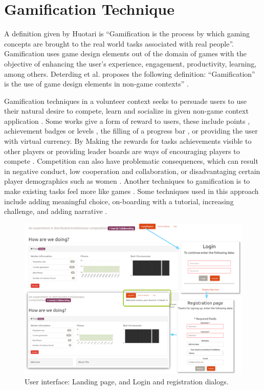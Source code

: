 \documentclass{llncs}
\begin{document}
\section{Gamification Technique}
\label{sec:experiments}
A definition given by Huotari  \cite{huotari2012defining} is ``Gamification is
the process by which gaming concepts are brought to the real world tasks associated with
real people''. Gamification uses game design elements out of the domain of games 
with the objective of enhancing the user's experience, engagement, productivity, 
learning, among others. Deterding et al. proposes the following definition:
 ``Gamification” is the use of game design elements in non-game contexts'' 
 \cite{deterding2011gamification}.

Gamification techniques in a volunteer context seeks to persuade 
users to use their natural desire to compete, learn and socialize in 
given non-game context application \cite{deterding2011game,hamari2014does}.  
Some works give a form of reward to users, these include 
points \cite{sutter2010browse}, achievement badges or levels \cite{hamari2011framework}, 
the filling of a progress bar \cite{o2010get}, or providing the user with virtual currency.
By Making the rewards for  tasks achievements visible to other players or 
providing leader boards are ways of encouraging players to compete \cite{hickman2010total}. 
Competition can also have problematic consequences, which can result in
negative conduct, low cooperation and collaboration, or disadvantaging certain player demographics
such as women \cite{kumar2013gamification}. Another techniques to gamification 
is to make existing tasks feel more like games \cite{deterding2010just}. 
Some techniques used in this approach include adding meaningful choice, 
on-boarding with a tutorial, increasing challenge, and adding narrative \cite{mcgonigal2011reality}.


\begin{figure}[t]
    \centering
        \includegraphics[width=5in]{img/login.png}
    \caption{ User interface: Landing page, and Login and registration dialogs.  
    }
    \label{fig:login}
\end{figure}
\end{document}
